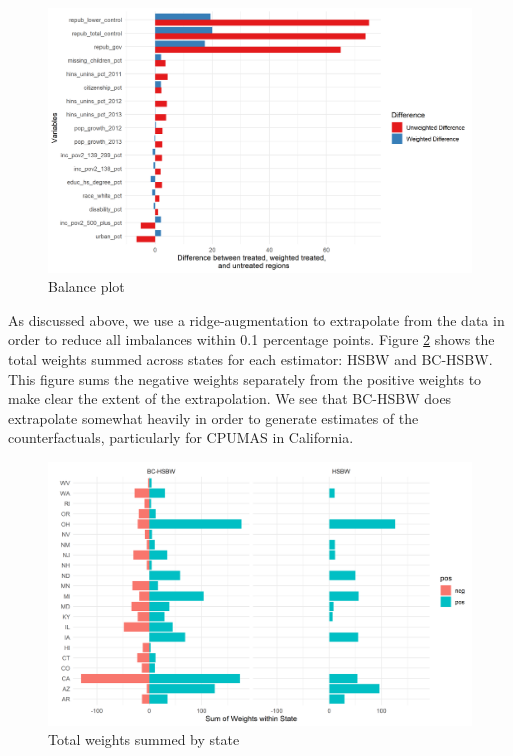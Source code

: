 \documentclass[12pt]{article}
\begin{document}
\begin{figure}[B]
\begin{center}
    \includegraphics[scale=0.6]{01_Plots/balance-plot-etu.png}
    \caption{Balance plot}
    \label{loveplot}
\end{center}
\end{figure}

As discussed above, we use a ridge-augmentation to extrapolate from the data in order to reduce all imbalances within 0.1 percentage points. Figure \ref{statewghts} shows the total weights summed across states for each estimator: HSBW and BC-HSBW. This figure sums the negative weights separately from the positive weights to make clear the extent of the extrapolation. We see that BC-HSBW does extrapolate somewhat heavily in order to generate estimates of the counterfactuals, particularly for CPUMAS in California. 

\begin{figure}[B]
\begin{center}
    \includegraphics[scale=0.6]{01_Plots/weights-by-state-main.png}
    \caption{Total weights summed by state}
    \label{statewghts}
\end{center}
\end{figure}
\end{document}
